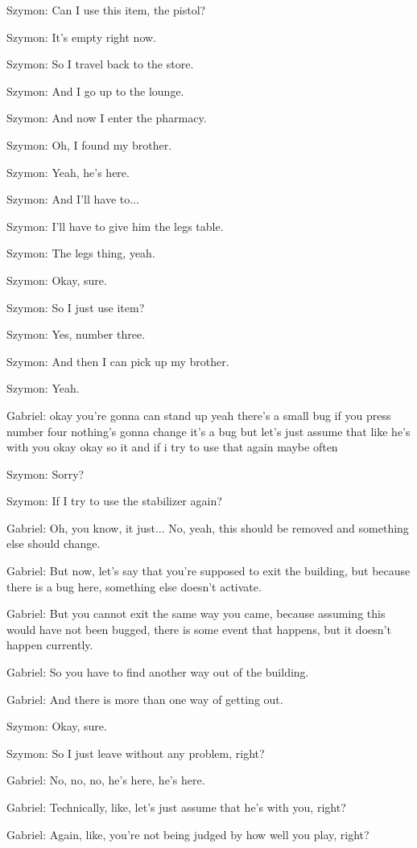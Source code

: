 Szymon: Can I use this item, the pistol?

Szymon: It's empty right now.

Szymon: So I travel back to the store.

Szymon: And I go up to the lounge.

Szymon: And now I enter the pharmacy.

Szymon: Oh, I found my brother.

Szymon: Yeah, he's here.

Szymon: And I'll have to...

Szymon: I'll have to give him the legs table.

Szymon: The legs thing, yeah.

Szymon: Okay, sure.

Szymon: So I just use item?

Szymon: Yes, number three.

Szymon: And then I can pick up my brother.

Szymon: Yeah.

Gabriel: okay you're gonna can stand up yeah there's a small bug if you press number four nothing's gonna change it's a bug but let's just assume that like he's with you okay okay so it and if i try to use that again maybe often

Szymon: Sorry?

Szymon: If I try to use the stabilizer again?

Gabriel: Oh, you know, it just... No, yeah, this should be removed and something else should change.

Gabriel: But now, let's say that you're supposed to exit the building, but because there is a bug here, something else doesn't activate.

Gabriel: But you cannot exit the same way you came, because assuming this would have not been bugged, there is some event that happens, but it doesn't happen currently.

Gabriel: So you have to find another way out of the building.

Gabriel: And there is more than one way of getting out.

Szymon: Okay, sure.

Szymon: So I just leave without any problem, right?

Gabriel: No, no, no, he's here, he's here.

Gabriel: Technically, like, let's just assume that he's with you, right?

Gabriel: Again, like, you're not being judged by how well you play, right?

